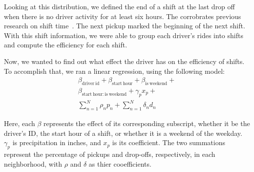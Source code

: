 \documentclass[twocolumn]{article}
\begin{document}
Looking at this distribution, we defined the end of a shift at the last drop off when there is no driver activity for at least six hours. The corrobrates previous research on shift time~\cite{Farber:2014}. The next pickup marked the beginning of the next shift. With this shift information, we were able to group each driver's rides into shifts and compute the efficiency for each shift.

Now, we wanted to find out what effect the driver has on the efficiency of shifts. To accomplish that, we ran a linear regression, using the following model: 
\begin{equation}
\begin{split}
\beta_{\mathrm{driver~id}} + \beta_{\mathrm{start~hour}} + \beta_{\mathrm{is~weekend}} +\\
 \beta_{\mathrm{start~hour:is~weekend}} + \gamma_p x_p +  \\
 \sum_{n=1}^N \rho_n p_n + \sum_{n=1}^N \delta_n d_n
\end{split}
\end{equation}


Here, each $\beta$ represents the effect of its corresponding subscript, whether it be the driver’s ID, the start hour of a shift, or whether it is a weekend of the weekday. $\gamma_p$ is precipitation in inches, and $x_p$ is its coefficient. The two summations represent the percentage of pickups and drop-offs, respectively, in each neighborhood, with $\rho$ and $\delta$ as thier cooefficients.
\end{document}
